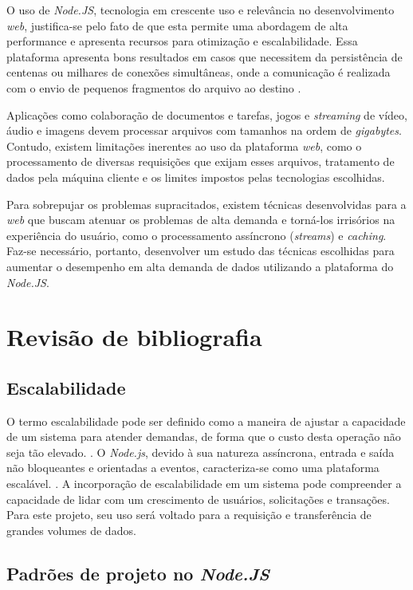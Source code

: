 \documentclass[12pt]{article}
\begin{document}
O uso de \textit{Node.JS}, tecnologia em crescente uso e relevância no
desenvolvimento \textit{web}, justifica-se pelo fato de que esta permite uma abordagem de alta
performance e apresenta recursos para otimização e escalabilidade. Essa plataforma apresenta
bons resultados em casos que necessitem da persistência de centenas ou milhares de conexões
simultâneas, onde a comunicação é realizada com o envio de pequenos fragmentos do arquivo ao destino
\cite[p. 112]{EJSMONT}.

Aplicações como colaboração de documentos e tarefas, jogos e \textit{streaming} de vídeo, áudio e imagens
\cite{ZRHR} devem processar arquivos com tamanhos na ordem de \textit{gigabytes}. 
Contudo, existem limitações inerentes ao uso da plataforma \textit{web}, como o processamento de 
diversas requisições que exijam esses arquivos, tratamento de dados pela máquina 
cliente e os limites impostos pelas tecnologias escolhidas.

Para sobrepujar os problemas supracitados, existem técnicas desenvolvidas para a \textit{web} que buscam
atenuar os problemas de alta demanda e torná-los irrisórios na experiência do usuário, como o processamento
assíncrono (\textit{streams}) e \textit{caching}. Faz-se necessário, portanto, desenvolver um estudo das 
técnicas escolhidas para aumentar o desempenho em alta demanda de dados utilizando a plataforma do \textit{Node.JS}.


\section{Revisão de bibliografia}

\subsection{Escalabilidade}

O termo escalabilidade pode ser definido como a maneira de ajustar a
capacidade de um sistema para atender demandas, de forma que o custo desta
operação não seja tão elevado. \cite[p. 3]{EJSMONT}. O \textit{Node.js}, devido à sua natureza
assíncrona, entrada e saída não bloqueantes e orientadas a eventos, caracteriza-se como
uma plataforma escalável. \cite[p. 2]{SCALABILITY}. A incorporação de escalabilidade
em um sistema pode compreender a capacidade de lidar com um crescimento de usuários, solicitações
e transações. Para este projeto, seu uso será voltado para a requisição e transferência de grandes volumes de dados.


\subsection{Padrões de projeto no \textit{Node.JS}}
\end{document}
